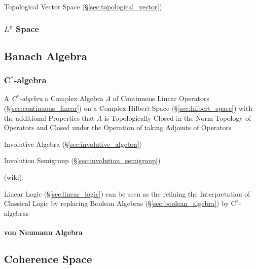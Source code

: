 Topological Vector Space (\S\ref{sec:topological_vector})



\subsubsection{$L^p$ Space}\label{sec:lp_space}



\subsection{Banach Algebra}\label{sec:banach_algebra}

\subsubsection{C$^*$-algebra}\label{sec:cstar_algebra}

A \emph{C$^*$-algebra} a Complex Algebra $A$ of Continuous Linear
Operators (\S\ref{sec:continuous_linear}) on a Complex Hilbert Space
(\S\ref{sec:hilbert_space}) with the additional Properties that $A$ is
Topologically Closed in the Norm Topology of Operators and Closed
under the Operation of taking Adjoints of Operators

Involutive Algebra (\S\ref{sec:involutive_algebra})

Involution Semigroup (\S\ref{sec:involution_semigroup})

(wiki):

Linear Logic (\S\ref{sec:linear_logic}) can be seen as the refining
the Interpretation of Classical Logic by replacing Boolean Algebras
(\S\ref{sec:boolean_algebra}) by C$^*$-algebras



\paragraph{von Neumann Algebra}\label{sec:vonneumann_algebra}\hfill



\subsection{Coherence Space}\label{sec:coherence_space}

